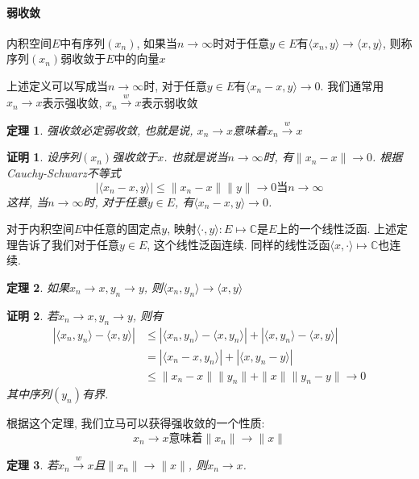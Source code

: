 \documentclass[a4paper,11pt]{article}
\theoremstyle{mystyle}
\newtheorem{theorem}{\hspace{2em}定理}[section]
\newtheorem{Proof}{\hspace{2em}证明}[section]
\begin{document}
\paragraph*{弱收敛}
\begin{definition}
  内积空间$E$中有序列$(x_n)$, 如果当$n\to \infty$时对于任意$y\in E$有$\langle x_n,y\rangle\to\langle x,y\rangle$, 则称序列$(x_n)$弱收敛于$E$中的向量$x$
\end{definition}
上述定义可以写成当$n\to\infty$时, 对于任意$y\in E$有$\langle x_n-x,y\rangle\to 0$. 我们通常用$x_n\to x$表示强收敛, $x_n\stackrel{w}{\to} x$表示弱收敛
\begin{theorem}
  强收敛必定弱收敛, 也就是说, $x_n\to x$意味着$x_n\stackrel{w}{\to}x$
\end{theorem}
\begin{Proof}
  设序列$(x_n)$强收敛于$x$. 也就是说当$n\to \infty$时, 有$\|x_n-x\|\to 0$. 根据Cauchy-Schwarz不等式
  \begin{equation*}
    |\langle x_n-x,y\rangle|\leq\|x_n-x\|\|y\|\to 0\text{当$n\to\infty$}
  \end{equation*}
  这样, 当$n\to \infty$时, 对于任意$y\in E$, 有$\langle x_n-x,y\rangle\to 0$.
\end{Proof}
对于内积空间$E$中任意的固定点$y$, 映射$\langle\cdot,y\rangle:E\mapsto\mathbb{C}$是$E$上的一个线性泛函. 上述定理告诉了我们对于任意$y\in E$, 这个线性泛函连续. 同样的线性泛函$\langle x,\cdot\rangle\mapsto\mathbb{C}$也连续.
\begin{theorem}
  如果$x_n\to x,y_n\to y$, 则$\langle x_n,y_n\rangle\to\langle x,y\rangle$
\end{theorem}
\begin{Proof}
  若$x_n\to x,y_n\to y$, 则有
  \begin{equation*}
  \begin{split}
     |\langle x_n,y_n\rangle-\langle x,y\rangle|& \leq|\langle x_n,y_n\rangle-\langle x,y_n\rangle|+|\langle x,y_n\rangle-\langle x,y\rangle| \\
       & =|\langle x_n-x,y_n\rangle|+|\langle x,y_n-y\rangle| \\
       & \leq\|x_n-x\|\|y_n\|+\|x\|\|y_n-y\|\to 0
  \end{split}
  \end{equation*}
  其中序列$(y_n)$有界.
\end{Proof}
根据这个定理, 我们立马可以获得强收敛的一个性质:
\begin{equation*}
  x_n\to x\text{意味着$\|x_n\|\to\|x\|$}
\end{equation*}
\begin{theorem}
  若$x_n\stackrel{w}{\to}x$且$\|x_n\|\to\|x\|$, 则$x_n\to x$.
\end{theorem}
\end{document}
